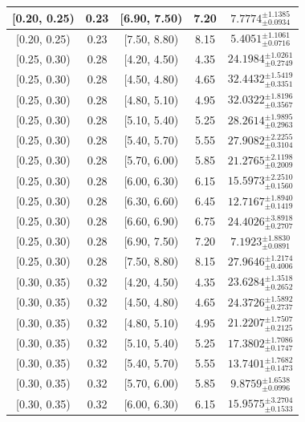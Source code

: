 \begin{longtable}{|c|c|c|c|c|}
\hline
[0.20, 0.25) & 0.23 & [6.90, 7.50) & 7.20 & $7.7774^{ \pm 1.1385 }_{ \pm 0.0934 }$ \\ 
\hline
[0.20, 0.25) & 0.23 & [7.50, 8.80) & 8.15 & $5.4051^{ \pm 1.1061 }_{ \pm 0.0716 }$ \\ 
\hline
[0.25, 0.30) & 0.28 & [4.20, 4.50) & 4.35 & $24.1984^{ \pm 1.0261 }_{ \pm 0.2749 }$ \\ 
\hline
[0.25, 0.30) & 0.28 & [4.50, 4.80) & 4.65 & $32.4432^{ \pm 1.5419 }_{ \pm 0.3351 }$ \\ 
\hline
[0.25, 0.30) & 0.28 & [4.80, 5.10) & 4.95 & $32.0322^{ \pm 1.8196 }_{ \pm 0.3567 }$ \\ 
\hline
[0.25, 0.30) & 0.28 & [5.10, 5.40) & 5.25 & $28.2614^{ \pm 1.9895 }_{ \pm 0.2963 }$ \\ 
\hline
[0.25, 0.30) & 0.28 & [5.40, 5.70) & 5.55 & $27.9082^{ \pm 2.2255 }_{ \pm 0.3104 }$ \\ 
\hline
[0.25, 0.30) & 0.28 & [5.70, 6.00) & 5.85 & $21.2765^{ \pm 2.1198 }_{ \pm 0.2009 }$ \\ 
\hline
[0.25, 0.30) & 0.28 & [6.00, 6.30) & 6.15 & $15.5973^{ \pm 2.2510 }_{ \pm 0.1560 }$ \\ 
\hline
[0.25, 0.30) & 0.28 & [6.30, 6.60) & 6.45 & $12.7167^{ \pm 1.8940 }_{ \pm 0.1419 }$ \\ 
\hline
[0.25, 0.30) & 0.28 & [6.60, 6.90) & 6.75 & $24.4026^{ \pm 3.8918 }_{ \pm 0.2707 }$ \\ 
\hline
[0.25, 0.30) & 0.28 & [6.90, 7.50) & 7.20 & $7.1923^{ \pm 1.8830 }_{ \pm 0.0891 }$ \\ 
\hline
[0.25, 0.30) & 0.28 & [7.50, 8.80) & 8.15 & $27.9646^{ \pm 1.2174 }_{ \pm 0.4006 }$ \\ 
\hline
[0.30, 0.35) & 0.32 & [4.20, 4.50) & 4.35 & $23.6284^{ \pm 1.3518 }_{ \pm 0.2652 }$ \\ 
\hline
[0.30, 0.35) & 0.32 & [4.50, 4.80) & 4.65 & $24.3726^{ \pm 1.5892 }_{ \pm 0.2737 }$ \\ 
\hline
[0.30, 0.35) & 0.32 & [4.80, 5.10) & 4.95 & $21.2207^{ \pm 1.7507 }_{ \pm 0.2125 }$ \\ 
\hline
[0.30, 0.35) & 0.32 & [5.10, 5.40) & 5.25 & $17.3802^{ \pm 1.7086 }_{ \pm 0.1747 }$ \\ 
\hline
[0.30, 0.35) & 0.32 & [5.40, 5.70) & 5.55 & $13.7401^{ \pm 1.7682 }_{ \pm 0.1473 }$ \\ 
\hline
[0.30, 0.35) & 0.32 & [5.70, 6.00) & 5.85 & $9.8759^{ \pm 1.6538 }_{ \pm 0.0996 }$ \\ 
\hline
[0.30, 0.35) & 0.32 & [6.00, 6.30) & 6.15 & $15.9575^{ \pm 3.2704 }_{ \pm 0.1533 }$ \\ 

\end{longtable}
